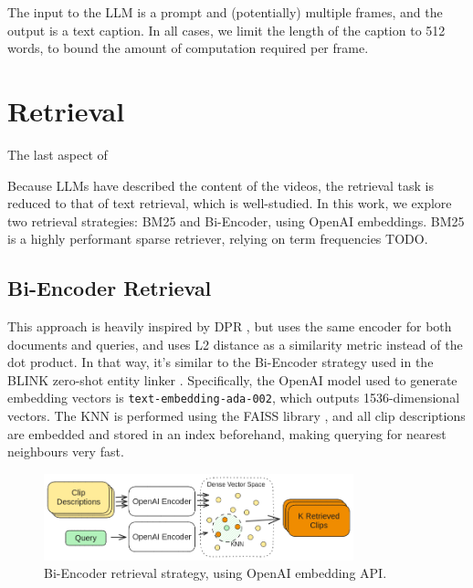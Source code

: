 The input to the LLM is a prompt and (potentially) multiple frames, and the output is a text caption.
In all cases, we limit the length of the caption to 512 words, to bound the amount of computation required per frame.

\section{Retrieval}

The last aspect of 

Because LLMs have described the content of the videos, the retrieval task is reduced to that of text retrieval, which is well-studied.
In this work, we explore two retrieval strategies: BM25 and Bi-Encoder, using OpenAI embeddings.
BM25 is a highly performant sparse retriever, relying on term frequencies TODO.

\subsection{Bi-Encoder Retrieval}
This approach is heavily inspired by DPR \cite{dpr}, but uses the same encoder for both documents and queries, and uses L2 distance as a similarity metric instead of the dot product.
In that way, it's similar to the Bi-Encoder strategy used in the BLINK zero-shot entity linker \cite{blink}.
Specifically, the OpenAI model used to generate embedding vectors is \verb|text-embedding-ada-002|, which outputs 1536-dimensional vectors.
The KNN is performed using the FAISS library \cite{faiss}, and all clip descriptions are embedded and stored in an index beforehand, making querying for nearest neighbours very fast.

\begin{figure}
      \centering
      \includegraphics[width=0.8\textwidth]{figures/openai_DPR.png}
      \caption{Bi-Encoder retrieval strategy, using OpenAI embedding API.}
      \label{fig:bienc}
\end{figure}

